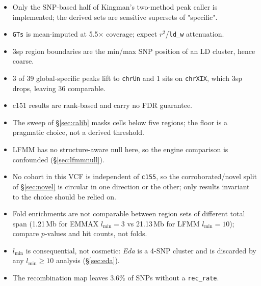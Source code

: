 \documentclass[11pt,a4paper]{article}
\newcommand{\gene}[1]{\textit{#1}}
\begin{document}
\begin{itemize}\itemsep2pt
\item Only the SNP-based half of Kingman's two-method peak caller is implemented; the
      derived sets are sensitive supersets of "specific".
\item \texttt{GTs} is mean-imputed at 5.5$\times$ coverage; expect $r^2$/\texttt{ld\_w}
      attenuation.
\item 3sp region boundaries are the min/max SNP position of an LD cluster, hence coarse.
\item 3 of 39 global-specific peaks lift to \texttt{chrUn} and 1 sits on \texttt{chrXIX},
      which 3sp drops, leaving 36 comparable.
\item c151 results are rank-based and carry no FDR guarantee.
\item The sweep of \S\ref{sec:calib} masks cells below five regions; the floor is a
      pragmatic choice, not a derived threshold.
\item LFMM has no structure-aware null here, so the engine comparison is confounded
      (\S\ref{sec:lfmmnull}).
\item No cohort in this VCF is independent of \texttt{c155}, so the corroborated/novel
      split of \S\ref{sec:novel} is circular in one direction or the other; only results
      invariant to the choice should be relied on.
\item Fold enrichments are not comparable between region sets of different total span
      (1.21\,Mb for EMMAX $l_{\min}{=}3$ vs 21.13\,Mb for LFMM $l_{\min}{=}10$); compare
      $p$-values and hit counts, not folds.
\item $l_{\min}$ is consequential, not cosmetic: \gene{Eda} is a 4-SNP cluster and is
      discarded by any $l_{\min}{\geq}10$ analysis (\S\ref{sec:eda}).
\item The recombination map leaves 3.6\% of SNPs without a \texttt{rec\_rate}.
\end{itemize}
\end{document}
